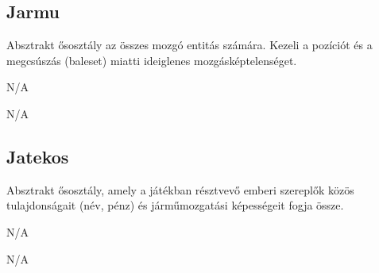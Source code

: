 \subsection{Jarmu}
\begin{class-template-responsibility}
   Absztrakt ősosztály az összes mozgó entitás számára. Kezeli a pozíciót és a megcsúszás (baleset) miatti ideiglenes mozgásképtelenséget.
\end{class-template-responsibility}
\begin{class-template-baseclass}
    N/A
\end{class-template-baseclass}
\begin{class-template-interface}
    N/A
\end{class-template-interface}
\begin{class-template-attribute}
\end{class-template-attribute}
\begin{class-template-method}
\end{class-template-method}

\subsection{Jatekos}
\begin{class-template-responsibility}
   Absztrakt ősosztály, amely a játékban résztvevő emberi szereplők közös tulajdonságait (név, pénz) és járműmozgatási képességeit fogja össze.
\end{class-template-responsibility}
\begin{class-template-baseclass}
    N/A
\end{class-template-baseclass}
\begin{class-template-interface}
    N/A
\end{class-template-interface}
\begin{class-template-attribute}
\end{class-template-attribute}
\begin{class-template-method}
\end{class-template-method}


